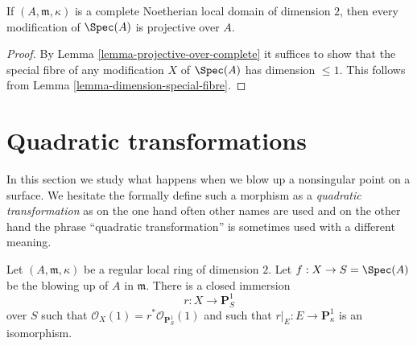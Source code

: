 \begin{lemma}
\label{lemma-modification-of-dim-2-is-projective-over-complete}
If $(A, \mathfrak m, \kappa)$ is a complete Noetherian local domain
of dimension $2$, then every modification of $\Spec(A)$ is projective over $A$.
\end{lemma}

\begin{proof}
By Lemma \ref{lemma-projective-over-complete} it suffices to show that
the special fibre of any modification $X$ of $\Spec(A)$ has dimension
$\leq 1$. This follows from Lemma \ref{lemma-dimension-special-fibre}.
\end{proof}





\section{Quadratic transformations}
\label{section-quadratic}

\noindent
In this section we study what happens when we blow up a nonsingular point
on a surface. We hesitate the formally define such a morphism as a
{\it quadratic transformation} as on the one hand often other names are
used and on the other hand the phrase ``quadratic transformation'' is
sometimes used with a different meaning.

\begin{lemma}
\label{lemma-blowup}
Let $(A, \mathfrak m, \kappa)$ be a regular local ring of dimension $2$.
Let $f : X \to S = \Spec(A)$ be the blowing up of $A$ in $\mathfrak m$.
There is a closed immersion
$$
r : X \longrightarrow \mathbf{P}^1_S
$$
over $S$ such that $\mathcal{O}_X(1) = r^*\mathcal{O}_{\mathbf{P}^1_S}(1)$
and such that $r|_E : E \to \mathbf{P}^1_\kappa$ is an isomorphism.
\end{lemma}

